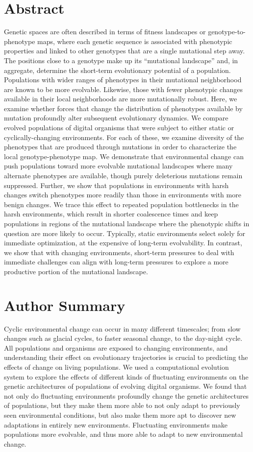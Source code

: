 \documentclass[10pt,letterpaper,final]{article}
\begin{document}
\section*{Abstract}
Genetic spaces are often described in terms of fitness landscapes or genotype-to-phenotype maps, where each genetic sequence is associated with phenotypic properties and linked to other genotypes that are a single mutational step away.  The positions close to a genotype make up its ``mutational landscape'' and, in aggregate, determine the short-term evolutionary potential of a population.
Populations with wider ranges of phenotypes in their mutational neighborhood are known to be more evolvable. Likewise, those with fewer phenotypic changes available in their local neighborhoods are more mutationally robust. Here, we examine whether forces that change the distribution of phenotypes available by mutation profoundly alter subsequent evolutionary dynamics. We compare evolved populations of digital organisms that were subject to either static or cyclically-changing environments.  For each of these, we examine diversity of the phenotypes that are produced through mutations in order to characterize the local genotype-phenotype map.
We demonstrate that environmental change can push populations toward more evolvable mutational landscapes where many alternate phenotypes are available, though purely deleterious mutations remain suppressed.
Further, we show that populations in environments with harsh changes switch phenotypes more readily than those in environments with more benign changes. We trace this effect to repeated population bottlenecks in the harsh environments, which result in shorter coalescence times and keep populations in regions of the mutational landscape where the phenotypic shifts in question are more likely to occur. 
Typically, static environments select solely for immediate optimization, at the expensive of long-term evolvability.
In contrast, we show that with changing environments, short-term pressures to deal with immediate challenges can align with long-term pressures to explore a more productive portion of the mutational landscape. 

\section*{Author Summary}
Cyclic environmental change can occur in many different timescales; from slow changes such as glacial cycles, to faster seasonal change, to the day-night cycle. All populations and organisms are exposed to changing environments, and understanding their effect on evolutionary trajectories is crucial to predicting the effects of change on living populations. We used a computational evolution system to explore the effects of different kinds of fluctuating environments on the genetic architectures of populations of evolving digital organisms. We found that not only do fluctuating environments profoundly change the genetic architectures of populations, but they make them more able to not only adapt to previously seen environmental conditions, but also make them more apt to discover new adaptations in entirely new environments. Fluctuating environments make populations more evolvable, and thus more able to adapt to new environmental change.
\end{document}
